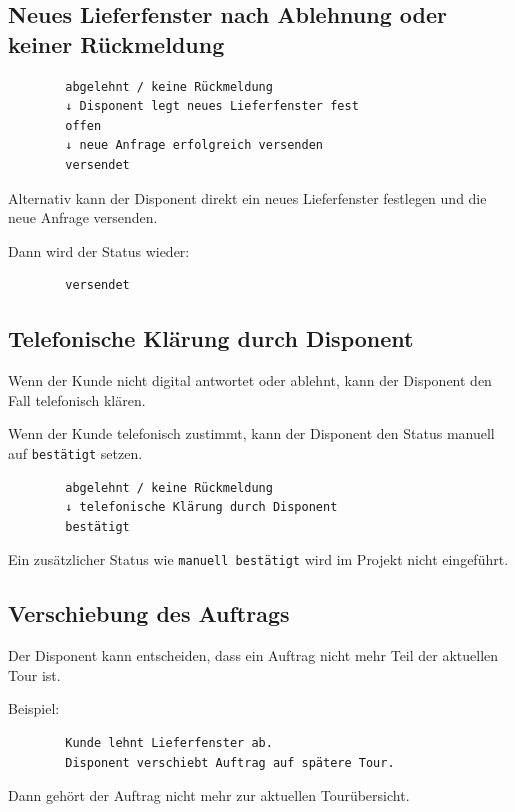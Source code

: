 \documentclass[12pt,a4paper]{article}
\begin{document}
	\subsection{Neues Lieferfenster nach Ablehnung oder keiner Rückmeldung}
	
	\begin{lstlisting}
		abgelehnt / keine Rückmeldung
		↓ Disponent legt neues Lieferfenster fest
		offen
		↓ neue Anfrage erfolgreich versenden
		versendet
	\end{lstlisting}
	
	Alternativ kann der Disponent direkt ein neues Lieferfenster festlegen und die neue Anfrage versenden.
	
	Dann wird der Status wieder:
	
	\begin{lstlisting}
		versendet
	\end{lstlisting}
	
	\subsection{Telefonische Klärung durch Disponent}
	
	Wenn der Kunde nicht digital antwortet oder ablehnt, kann der Disponent den Fall telefonisch klären.
	
	Wenn der Kunde telefonisch zustimmt, kann der Disponent den Status manuell auf \texttt{bestätigt} setzen.
	
	\begin{lstlisting}
		abgelehnt / keine Rückmeldung
		↓ telefonische Klärung durch Disponent
		bestätigt
	\end{lstlisting}
	
	Ein zusätzlicher Status wie \texttt{manuell bestätigt} wird im Projekt nicht eingeführt.
	
	\subsection{Verschiebung des Auftrags}
	
	Der Disponent kann entscheiden, dass ein Auftrag nicht mehr Teil der aktuellen Tour ist.
	
	Beispiel:
	
	\begin{lstlisting}
		Kunde lehnt Lieferfenster ab.
		Disponent verschiebt Auftrag auf spätere Tour.
	\end{lstlisting}
	
	Dann gehört der Auftrag nicht mehr zur aktuellen Tourübersicht.
	
\end{document}
